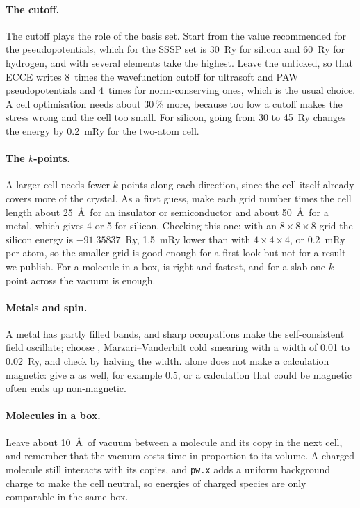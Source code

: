 \paragraph{The cutoff.} The cutoff plays the role of the basis set. Start from the value recommended for the pseudopotentials, which for the SSSP set is 30~Ry for silicon and 60~Ry for hydrogen, and with several elements take the highest. Leave the  unticked, so that ECCE writes 8~times the wavefunction cutoff for ultrasoft and PAW pseudopotentials and 4~times for norm-conserving ones, which is the usual choice. A cell optimisation needs about 30\,\% more, because too low a cutoff makes the stress wrong and the cell too small. For silicon, going from 30 to 45~Ry changes the energy by 0.2~mRy for the two-atom cell.

\paragraph{The $k$-points.} A larger cell needs fewer $k$-points along each direction, since the cell itself already covers more of the crystal. As a first guess, make each grid number times the cell length about 25~\AA\ for an insulator or semiconductor and about 50~\AA\ for a metal, which gives 4 or 5 for silicon. Checking this one: with an $8\times8\times8$ grid the silicon energy is $-91.35837$~Ry, 1.5~mRy lower than with $4\times4\times4$, or 0.2~mRy per atom, so the smaller grid is good enough for a first look but not for a result we publish. For a molecule in a box,  is right and fastest, and for a slab one $k$-point across the vacuum is enough.

\paragraph{Metals and spin.} A metal has partly filled bands, and sharp occupations make the self-consistent field oscillate; choose , Marzari--Vanderbilt cold smearing with a width of 0.01 to 0.02~Ry, and check by halving the width.  alone does not make a calculation magnetic: give a  as well, for example 0.5, or a calculation that could be magnetic often ends up non-magnetic.

\paragraph{Molecules in a box.} Leave about 10~\AA\ of vacuum between a molecule and its copy in the next cell, and remember that the vacuum costs time in proportion to its volume. A charged molecule still interacts with its copies, and \texttt{pw.x} adds a uniform background charge to make the cell neutral, so energies of charged species are only comparable in the same box.

